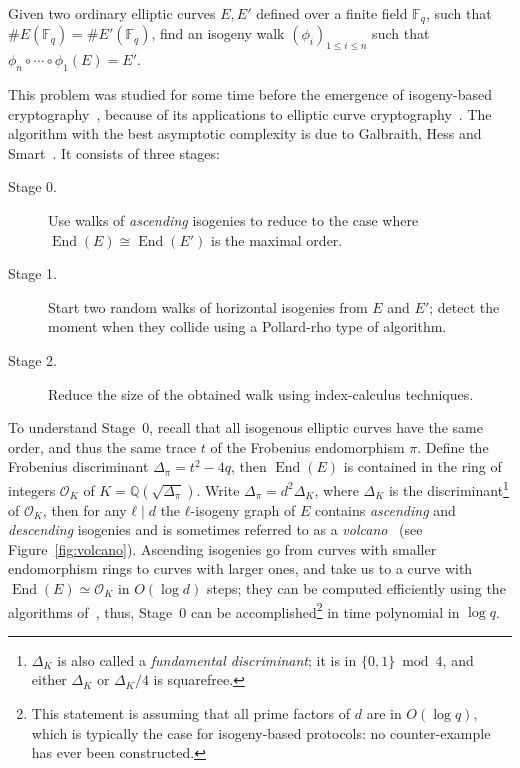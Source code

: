 \documentclass{llncs}
\newcommand{\F}{\mathbb{F}}
\renewcommand{\O}{\mathcal{O}}
\DeclareMathOperator{\End}{End}
\begin{document}
\begin{problem}
\label{prob:isog}
  Given two ordinary elliptic curves $E,E'$ defined over a finite
  field $\F_q$, such that $\#E(\F_q)=\#E'(\F_q)$, find an isogeny walk
  $(ϕ_i)_{1≤i≤n}$ such that $ϕ_n∘\cdots∘ϕ_1(E)=E'$.
\end{problem}

This problem was studied for some time before the emergence of
isogeny-based cryptography~\cite{Gal,GHS,galbraith+stolbunov11},
because of its applications to elliptic curve
cryptography~\cite{GHS,teske06,jao+miller+venkatesan09}.  The
algorithm with the best asymptotic complexity is due to Galbraith,
Hess and Smart~\cite{GHS}. It consists of three stages:
\begin{description}
\item[Stage 0.] Use walks of \emph{ascending} isogenies to reduce to the case where
  $\End(E)\cong\End(E')$ is the maximal order.
\item[Stage 1.] Start two random walks of horizontal isogenies 
  from $E$ and $E'$; detect the
  moment when they collide using a Pollard-rho type of algorithm.
\item[Stage 2.] Reduce the size of the obtained walk using
  index-calculus techniques.
\end{description}

To understand Stage~0, recall that all isogenous elliptic curves have
the same order, and thus the same trace $t$ of the Frobenius
endomorphism $π$. Define the Frobenius discriminant $Δ_π=t^2-4q$, then
$\End(E)$ is contained in the ring of integers $\O_K$ of
$K=ℚ(\sqrt{Δ_π})$. Write $Δ_π=d^2Δ_K$, where $Δ_K$ is the
discriminant\footnote{$Δ_K$ is also called a \emph{fundamental
    discriminant}; it is in $\{0,1\}\bmod 4$, and either $Δ_K$ or
  $Δ_K/4$ is squarefree.} of $\O_K$, then for any $ℓ\mid d$ the
$ℓ$-isogeny graph of $E$ contains \emph{ascending} and
\emph{descending} isogenies and is sometimes referred to as a
\emph{volcano}~\cite{fouquet+morain02} (see Figure~\ref{fig:volcano}).
Ascending isogenies go from curves with smaller endomorphism rings to
curves with larger ones, and take us to a curve with $\End(E)≃\O_K$ in
$O(\log d)$ steps; they can be computed efficiently using the
algorithms
of~\cite{kohel,fouquet+morain02,ionica+joux13,defeo2016explicit},
thus, Stage~0 can be accomplished\footnote{This statement is assuming
  that all prime factors of $d$ are in $O(\log q)$, which is typically
  the case for isogeny-based protocols: no counter-example
	has ever been constructed.}  in time polynomial in
$\log q$.
\end{document}
